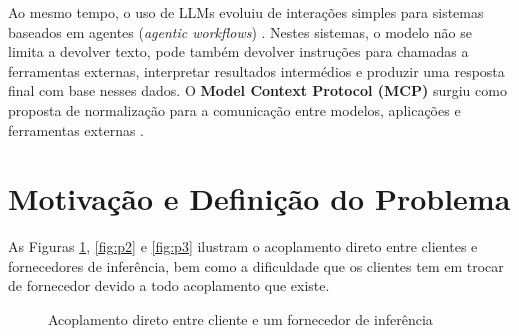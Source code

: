     Ao mesmo tempo, o uso de LLMs evoluiu de interações simples para sistemas baseados em agentes (\textit{agentic workflows}) \cite{ibm_agentic_workflows}. Nestes sistemas, o modelo não se limita a devolver texto, pode também devolver instruções para chamadas a ferramentas externas, interpretar resultados intermédios e produzir uma resposta final com base nesses dados. O \textbf{Model Context Protocol (MCP)} surgiu como proposta de normalização para a comunicação entre modelos, aplicações e ferramentas externas \cite{mcp_protocol}.

    \section{Motivação e Definição do Problema}

    As Figuras \ref{fig:p1}, \ref{fig:p2} e \ref{fig:p3} ilustram o acoplamento direto entre clientes e fornecedores de inferência, bem como a dificuldade que os clientes tem em trocar de fornecedor devido a todo acoplamento que existe.

    \begin{figure}[H]
        \centering
        \caption{Acoplamento direto entre cliente e um fornecedor de inferência}
        \label{fig:p1}
    \end{figure}

